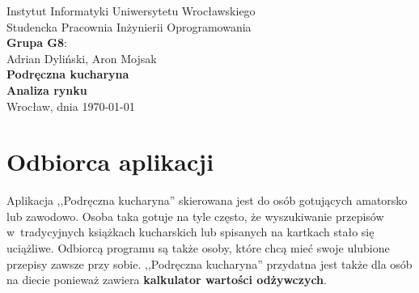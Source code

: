 \documentclass[a4paper,11pt,titlepage,twoside]{mwart}
\begin{document}
\begin{titlepage}
\begin{center}
\large{Instytut Informatyki Uniwersytetu Wrocławskiego\\Studencka Pracownia Inżynierii Oprogramowania}\\[3.0cm]
\Large {\bfseries Grupa G8}:\\
\large Adrian Dyliński, Aron Mojsak\\[4.0cm]
{ \Huge \bfseries Podręczna kucharyna}\\[0.5cm]
{ \large \bfseries Analiza rynku}\\
\vfill
{\large Wrocław, dnia \today}
\end{center}
\end{titlepage}

\thispagestyle{empty}
\mbox{}
\newpage
\setcounter{page}{1}
\tableofcontents
\newpage
\section{Odbiorca aplikacji}
Aplikacja ,,Podręczna kucharyna'' skierowana jest do osób gotujących amatorsko lub zawodowo. Osoba taka gotuje na tyle często, że wyszukiwanie przepisów w~tradycyjnych książkach kucharskich lub spisanych na kartkach stało się uciążliwe. Odbiorcą programu są także osoby, które chcą mieć swoje ulubione przepisy zawsze przy sobie. ,,Podręczna kucharyna'' przydatna jest także dla osób na diecie ponieważ zawiera \textbf{kalkulator wartości odżywczych}.
\end{document}
